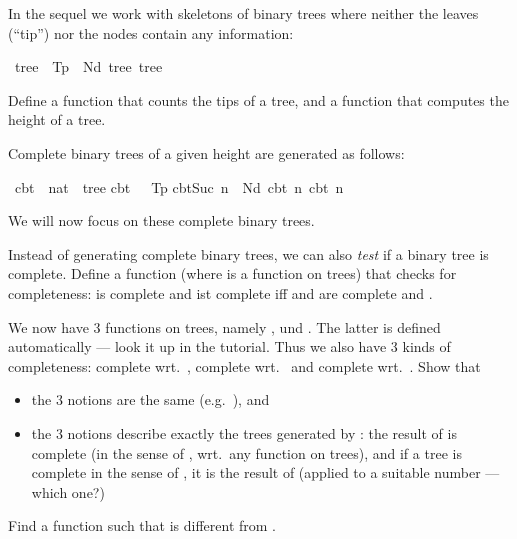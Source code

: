 %
\begin{isabellebody}%
\def\isabellecontext{Aufgabe{\isadigit{2}}}%
\isamarkupfalse%
%
\isamarkuptrue%
%
\begin{isamarkuptext}%
In the sequel we work with skeletons of binary trees where
neither the leaves (``tip'') nor the nodes contain any information:%
\end{isamarkuptext}%
\isamarkuptrue%
\ tree\ {\isacharequal}\ Tp\ {\isacharbar}\ Nd\ tree\ tree\isamarkupfalse%
%
\begin{isamarkuptext}%
Define a function  that counts the tips of a
tree, and a function  that computes the height of a
tree.

Complete binary trees of a given height are generated as follows:%
\end{isamarkuptext}%
\isamarkuptrue%
\ cbt\ {\isacharcolon}{\isacharcolon}\ {\isachardoublequote}nat\ {\isasymRightarrow}\ tree{\isachardoublequote}\isanewline
\isamarkupfalse%
\isanewline
{\isachardoublequote}cbt\ {}\ {\isacharequal}\ Tp{\isachardoublequote}\isanewline
{\isachardoublequote}cbt{\isacharparenleft}Suc\ n{\isacharparenright}\ {\isacharequal}\ Nd\ {\isacharparenleft}cbt\ n{\isacharparenright}\ {\isacharparenleft}cbt\ n{\isacharparenright}{\isachardoublequote}\isamarkupfalse%
%
\begin{isamarkuptext}%
We will now focus on these complete binary trees.

Instead of generating complete binary trees, we can also \emph{test}
if a binary tree is complete. Define a function 
(where  is a function on trees) that checks for completeness:
 is complete and  ist complete iff  and
 are complete and .

We now have 3 functions on trees, namely , 
und . The latter is defined automatically --- look it up
in the tutorial.  Thus we also have 3 kinds of completeness: complete
wrt.\ , complete wrt.\  and complete wrt.\
. Show that
\begin{itemize}
\item the 3 notions are the same (e.g.\ ),
      and
\item the 3 notions describe exactly the trees generated by :
the result of \isa{cbt} is complete (in the sense of ,
wrt.\ any function on trees), and if a tree is complete in the sense of
\isa{iscbt}, it is the result of \isa{cbt} (applied to a suitable number
--- which one?)
\end{itemize}
Find a function  such that  is different from
\isa{iscbt\ size}.


\end{isamarkuptext}
\end{isabellebody}
